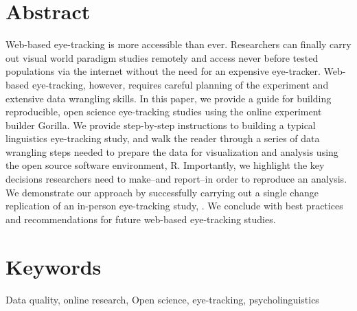 \section{Abstract}

Web-based eye-tracking is more accessible than ever. Researchers can finally carry out visual world paradigm studies remotely and access never before tested populations via the internet without the need for an expensive eye-tracker. Web-based eye-tracking, however, requires careful planning of the experiment and extensive data wrangling skills. In this paper, we provide a guide for building reproducible, open science eye-tracking studies using the online experiment builder Gorilla. We provide step-by-step instructions to building a typical linguistics eye-tracking study, and walk the reader through a series of data wrangling steps needed to prepare the data for visualization and analysis using the open source software environment, R. Importantly, we highlight the key decisions researchers need to make--and report--in order to reproduce an analysis. We demonstrate our approach by successfully carrying out a single change replication of an in-person eye-tracking study, \textcite{Porretta_et_al_2020}. We conclude with best practices and recommendations for future web-based eye-tracking studies.


\section{Keywords}
Data quality, online research, Open science, eye-tracking, psycholinguistics
\newpage



